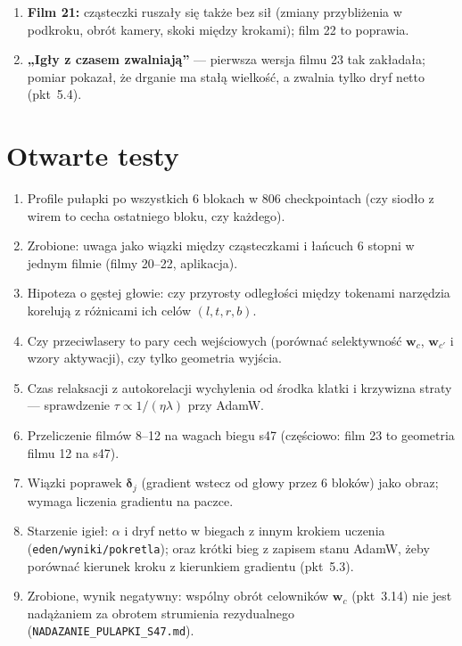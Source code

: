 \documentclass[a4paper,11pt]{article}
\newcounter{pn}
\begin{document}
\begin{enumerate}
LayerNorm (ten normuje każdy token osobno) i w podkrokach 2--137\,\% pokazanego ruchu było samą zmianą skali; teraz jedna skala na
checkpoint; (b) w układach względem środka rysowano surowe $A_{jk}$, $z_{jc}$ i wyrazy wolne, więc suma wektorów nie równała się ruchowi
(błąd 0,3--176); teraz rozkład z pkt~3.17; (c) położenie na osi uczenia było sumą wiązek, teraz jest stanem tokenu (pkt~3.2(2)).
\item \textbf{Film 21:} cząsteczki ruszały się także bez sił (zmiany przybliżenia w podkroku, obrót kamery, skoki między krokami); film 22
to poprawia.
\item \textbf{„Igły z czasem zwalniają”} --- pierwsza wersja filmu 23 tak zakładała; pomiar pokazał, że drganie ma stałą wielkość,
a zwalnia tylko dryf netto (pkt~5.4).
\end{enumerate}

\section{Otwarte testy}\label{sec:testy}
\begin{enumerate}
\item Profile pułapki po wszystkich 6 blokach w 806 checkpointach (czy siodło z wirem to cecha ostatniego bloku, czy każdego).
\item Zrobione: uwaga jako wiązki między cząsteczkami i łańcuch 6 stopni w jednym filmie (filmy 20--22, aplikacja).
\item Hipoteza o gęstej głowie: czy przyrosty odległości między tokenami narzędzia korelują z różnicami ich celów $(l,t,r,b)$.
\item Czy przeciwlasery to pary cech wejściowych (porównać selektywność $\bm w_c$, $\bm w_{c'}$ i wzory aktywacji), czy tylko geometria wyjścia.
\item Czas relaksacji z autokorelacji wychylenia od środka klatki i krzywizna straty --- sprawdzenie $\tau\propto1/(\eta\lambda)$ przy AdamW.
\item Przeliczenie filmów 8--12 na wagach biegu s47 (częściowo: film 23 to geometria filmu 12 na s47).
\item Wiązki poprawek $\bm\delta_j$ (gradient wstecz od głowy przez 6 bloków) jako obraz; wymaga liczenia gradientu na paczce.
\item Starzenie igieł: $\alpha$ i dryf netto w biegach z innym krokiem uczenia (\texttt{eden/wyniki/pokretla}); oraz krótki bieg
z zapisem stanu AdamW, żeby porównać kierunek kroku z kierunkiem gradientu (pkt~5.3).
\item Zrobione, wynik negatywny: wspólny obrót celowników $\bm w_c$ (pkt~3.14) nie jest nadążaniem za obrotem strumienia rezydualnego
(\texttt{NADAZANIE\_PULAPKI\_S47.md}).
\end{enumerate}
\end{document}
